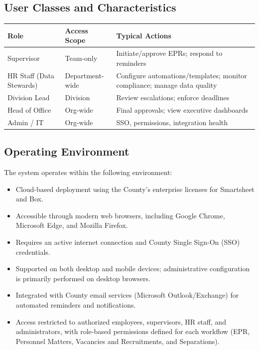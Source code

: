 \documentclass[12pt]{article}
\begin{document}
\subsection{User Classes and Characteristics}
\begin{longtable}{@{}p{4.2cm}p{3.2cm}p{6.2cm}@{}}
\toprule
\textbf{Role} & \textbf{Access Scope} & \textbf{Typical Actions} \\
\midrule
Supervisor & Team-only & Initiate/approve EPRs; respond to reminders \\
HR Staff (Data Stewards) & Department-wide & Configure automations/templates; monitor compliance; manage data quality \\
Division Lead & Division & Review escalations; enforce deadlines \\
Head of Office & Org-wide & Final approvals; view executive dashboards \\
Admin / IT & Org-wide & SSO, permissions, integration health \\
\bottomrule
\end{longtable}

\subsection{Operating Environment}

The system operates within the following environment:

\begin{itemize}
    \item Cloud-based deployment using the County’s enterprise licenses for Smartsheet and Box.
    \item Accessible through modern web browsers, including Google Chrome, Microsoft Edge, and Mozilla Firefox.
    \item Requires an active internet connection and County Single Sign-On (SSO) credentials.
    \item Supported on both desktop and mobile devices; administrative configuration is primarily performed on desktop browsers.
    \item Integrated with County email services (Microsoft Outlook/Exchange) for automated reminders and notifications.
    \item Access restricted to authorized employees, supervisors, HR staff, and administrators, with role-based permissions defined for each workflow (EPR, Personnel Matters, Vacancies and Recruitments, and Separations).
\end{itemize}
\end{document}
